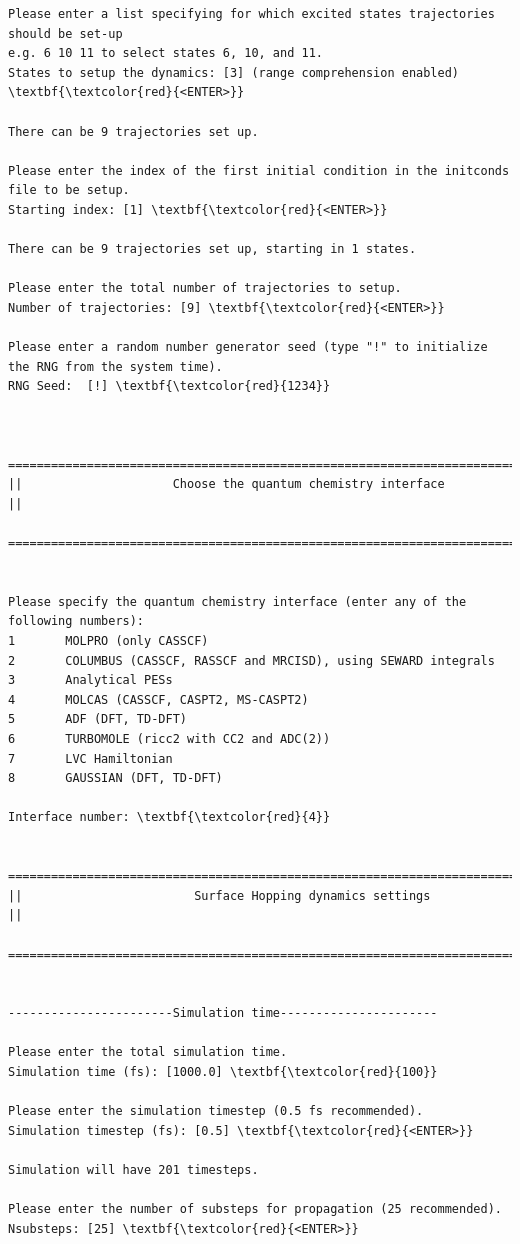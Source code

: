 \documentclass[a4paper,11pt,DIV=15,openany]{scrbook}
\begin{document}
\begin{oframed}
\begin{Verbatim}[commandchars=\\\{\}]
Please enter a list specifying for which excited states trajectories should be set-up
e.g. 6 10 11 to select states 6, 10, and 11.
States to setup the dynamics: [3] (range comprehension enabled) \textbf{\textcolor{red}{<ENTER>}}

There can be 9 trajectories set up.

Please enter the index of the first initial condition in the initconds file to be setup.
Starting index: [1] \textbf{\textcolor{red}{<ENTER>}}

There can be 9 trajectories set up, starting in 1 states.

Please enter the total number of trajectories to setup.
Number of trajectories: [9] \textbf{\textcolor{red}{<ENTER>}}

Please enter a random number generator seed (type "!" to initialize the RNG from the system time).
RNG Seed:  [!] \textbf{\textcolor{red}{1234}}


  ================================================================================
||                     Choose the quantum chemistry interface                     ||
  ================================================================================


Please specify the quantum chemistry interface (enter any of the following numbers):
1       MOLPRO (only CASSCF)
2       COLUMBUS (CASSCF, RASSCF and MRCISD), using SEWARD integrals
3       Analytical PESs
4       MOLCAS (CASSCF, CASPT2, MS-CASPT2)
5       ADF (DFT, TD-DFT)
6       TURBOMOLE (ricc2 with CC2 and ADC(2))
7       LVC Hamiltonian
8       GAUSSIAN (DFT, TD-DFT)

Interface number: \textbf{\textcolor{red}{4}}

  ================================================================================
||                        Surface Hopping dynamics settings                       ||
  ================================================================================


-----------------------Simulation time----------------------

Please enter the total simulation time.
Simulation time (fs): [1000.0] \textbf{\textcolor{red}{100}}

Please enter the simulation timestep (0.5 fs recommended).
Simulation timestep (fs): [0.5] \textbf{\textcolor{red}{<ENTER>}}

Simulation will have 201 timesteps.

Please enter the number of substeps for propagation (25 recommended).
Nsubsteps: [25] \textbf{\textcolor{red}{<ENTER>}}


\end{Verbatim}
\end{oframed}
\end{document}
